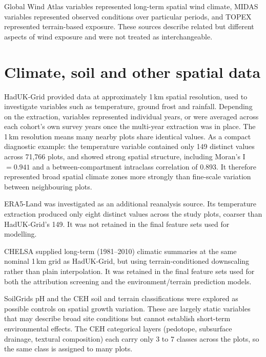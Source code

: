 \documentclass[11pt,a4paper]{report}
\begin{document}
Global Wind Atlas variables represented long-term spatial wind climate, MIDAS variables represented observed conditions over particular periods, and TOPEX represented terrain-based exposure.
These sources describe related but different aspects of wind exposure and were not treated as interchangeable.

\section{Climate, soil and other spatial data}
HadUK-Grid provided data at approximately 1\,km spatial resolution, used to investigate variables such as temperature, ground frost and rainfall.
Depending on the extraction, variables represented individual years, or were averaged across each cohort's own survey years once the multi-year extraction was in place.
The 1\,km resolution means many nearby plots share identical values.
As a compact diagnostic example: the temperature variable contained only 149 distinct values across 71,766 plots, and showed strong spatial structure, including Moran's I $=0.941$ and a between-compartment intraclass correlation of 0.893.
It therefore represented broad spatial climate zones more strongly than fine-scale variation between neighbouring plots.

ERA5-Land was investigated as an additional reanalysis source.
Its temperature extraction produced only eight distinct values across the study plots, coarser than HadUK-Grid's 149.
It was not retained in the final feature sets used for modelling.

CHELSA supplied long-term (1981--2010) climatic summaries at the same nominal 1\,km grid as HadUK-Grid, but using terrain-conditioned downscaling rather than plain interpolation.
It was retained in the final feature sets used for both the attribution screening and the environment/terrain prediction models.

SoilGrids pH and the CEH soil and terrain classifications were explored as possible controls on spatial growth variation.
These are largely static variables that may describe broad site conditions but cannot establish short-term environmental effects.
The CEH categorical layers (pedotope, subsurface drainage, textural composition) each carry only 3 to 7 classes across the plots, so the same class is assigned to many plots.
\end{document}
